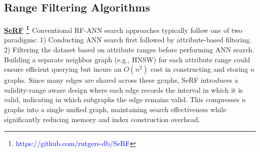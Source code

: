 \documentclass[sigconf, nonacm]{acmart}
\begin{document}
{	
	
%		
%		
%		
%			
%		
	
	\subsection{Range Filtering Algorithms}
	
	\noindent\textbf{\underline{SeRF} \footnote{\textcolor{blue}{https://github.com/rutgers-db/SeRF}} \cite{serf}} Conventional RF-ANN search approaches typically follow one of two paradigms: 1) Conducting ANN search first followed by attribute-based filtering. 2) Filtering the dataset based on attribute ranges before performing ANN search. Building a separate neighbor graph (e.g., HNSW) for each attribute range could ensure efficient querying but incurs an $O(n^2)$ cost in constructing and storing $n$ graphs. Since many edges are shared across these graphs, SeRF introduces a validity-range aware design where each edge records the interval in which it is valid, indicating in which subgraphs the edge remains valid. This compresses $n$ graphs into a single unified graph, maintaining search effectiveness while significantly reducing memory and index construction overhead.
	
}
\end{document}
